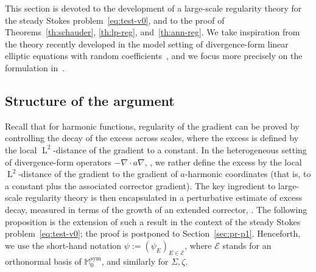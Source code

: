 \documentclass[JEP,XML,SOM,Unicode,published]{cedram}
\let\mathcal\mathscr
\theoremstyle{plain}
\theoremstyle{definition}
\newcommand{\Ec}{\mathcal E}
\newcommand{\Md}{\mathbb M}
\newcommand{\Ld}{\operatorname{L}}
\newcommand{\Sym}{{\operatorname{sym}}}
\begin{document}
This section is devoted to the development of a large-scale regularity theory for the steady Stokes problem~\eqref{eq:test-v0}, and to the proof of Theorems~\ref{th:schauder}, \ref{th:lp-reg}, and~\ref{th:ann-reg}.
We take inspiration from the theory recently developed in the model setting of divergence-form linear elliptic equations with random coefficients~\cite{AS,AM-16,AKM1,AKM2,AKM-book,GNO-reg,DO1,JO}, and we focus more precisely on the formulation in~\cite{GNO-reg,DO1}.

\subsection{Structure of the argument}

Recall that for harmonic functions, regularity of the gradient can be proved by controlling the decay of the excess across scales, where the excess is defined by the local $\Ld^2$-distance of the gradient to a constant.
In the heterogeneous setting of divergence-form operators $-\nabla \cdot a \nabla$, \cf \cite{GNO-reg}, we rather define the excess by the local $\Ld^2$-distance of the gradient to the gradient of $a$-harmonic coordinates (that is, to a constant plus the associated corrector gradient).
The key ingredient to large-scale regularity theory is then encapsulated in a perturbative estimate of excess decay, measured in terms of the growth of an extended corrector, \cf \cite[Prop.\,1]{GNO-reg}.
The following proposition is the extension of such a result in the context of the steady Stokes problem~\eqref{eq:test-v0};
the proof is postponed to Section~\ref{sec:pr-p1}.
Henceforth, we use the short-hand notation $\psi:=(\psi_E)_{E\in\Ec}$, where $\Ec$ stands for an orthonormal basis of $\Md_0^\Sym$, and similarly for $\Sigma,\zeta$.
\end{document}
